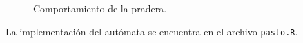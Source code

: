 \documentclass[12pt, twocolumn]{article}
\begin{document}
\begin{figure}[htbp]
\caption{Comportamiento de la pradera.} 
\label{pasto}
\end{figure}

La implementaci\'on del aut\'omata se encuentra en el archivo \texttt{pasto.R}.
\end{document}
